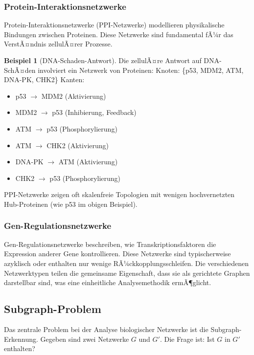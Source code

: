﻿\documentclass[a4paper,12pt]{article}
\theoremstyle{definition}
\newtheorem{beispiel}{Beispiel}
\begin{document}
\subsubsection{Protein-Interaktionsnetzwerke}

Protein-Interaktionsnetzwerke (PPI-Netzwerke) modellieren physikalische Bindungen zwischen Proteinen. Diese Netzwerke sind fundamental fÃ¼r das VerstÃ¤ndnis zellulÃ¤rer Prozesse.

\begin{beispiel}[DNA-Schaden-Antwort]
	Die zellulÃ¤re Antwort auf DNA-SchÃ¤den involviert ein Netzwerk von Proteinen:\newline
	Knoten: \{p53, MDM2, ATM, DNA-PK, CHK2\}\newline
	Kanten: 
	\begin{itemize}
		\item[-] p53 $\rightarrow$ MDM2 (Aktivierung)
		\item[-] MDM2 $\rightarrow$ p53 (Inhibierung, Feedback)
		\item[-] ATM $\rightarrow$ p53 (Phosphorylierung)
		\item[-] ATM $\rightarrow$ CHK2 (Aktivierung)
		\item[-] DNA-PK $\rightarrow$ ATM (Aktivierung)
		\item[-] CHK2 $\rightarrow$ p53 (Phosphorylierung)
	\end{itemize}
\end{beispiel}

PPI-Netzwerke zeigen oft skalenfreie Topologien mit wenigen hochvernetzten Hub-Proteinen (wie p53 im obigen Beispiel).

\subsubsection{Gen-Regulationsnetzwerke}

Gen-Regulationsnetzwerke beschreiben, wie Transkriptionsfaktoren die Expression anderer Gene kontrollieren. Diese Netzwerke sind typischerweise azyklisch oder enthalten nur wenige RÃ¼ckkopplungsschleifen. Die verschiedenen Netzwerktypen teilen die gemeinsame Eigenschaft, dass sie als gerichtete Graphen darstellbar sind, was eine einheitliche Analysemethodik ermÃ¶glicht.

\subsection{Subgraph-Problem}

Das zentrale Problem bei der Analyse biologischer Netzwerke ist die Subgraph-Erkennung. Gegeben sind zwei Netzwerke $G$ und $G'$. Die Frage ist: Ist $G$ in $G'$ enthalten?
\end{document}
